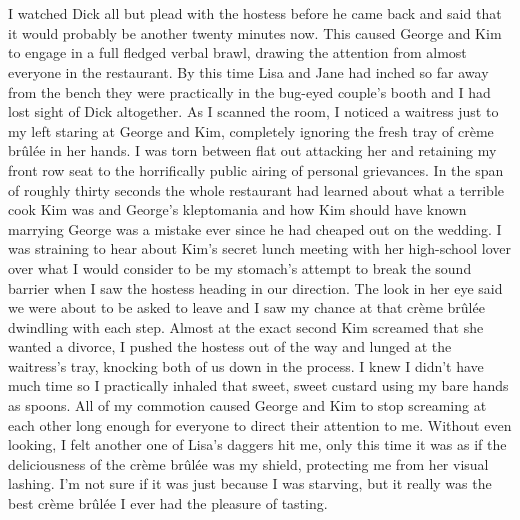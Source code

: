 \documentclass[]{book}
\begin{document}
\chapter{}\label{section-6}

I watched Dick all but plead with the hostess before he came back and
said that it would probably be another twenty minutes now. This caused
George and Kim to engage in a full fledged verbal brawl, drawing the
attention from almost everyone in the restaurant. By this time Lisa and
Jane had inched so far away from the bench they were practically in the
bug-eyed couple's booth and I had lost sight of Dick altogether. As I
scanned the room, I noticed a waitress just to my left staring at George
and Kim, completely ignoring the fresh tray of crème brûlée in her
hands. I was torn between flat out attacking her and retaining my front
row seat to the horrifically public airing of personal grievances. In
the span of roughly thirty seconds the whole restaurant had learned
about what a terrible cook Kim was and George's kleptomania and how Kim
should have known marrying George was a mistake ever since he had
cheaped out on the wedding. I was straining to hear about Kim's secret
lunch meeting with her high-school lover over what I would consider to
be my stomach's attempt to break the sound barrier when I saw the
hostess heading in our direction. The look in her eye said we were about
to be asked to leave and I saw my chance at that crème brûlée dwindling
with each step. Almost at the exact second Kim screamed that she wanted
a divorce, I pushed the hostess out of the way and lunged at the
waitress's tray, knocking both of us down in the process. I knew I
didn't have much time so I practically inhaled that sweet, sweet custard
using my bare hands as spoons. All of my commotion caused George and Kim
to stop screaming at each other long enough for everyone to direct their
attention to me. Without even looking, I felt another one of Lisa's
daggers hit me, only this time it was as if the deliciousness of the
crème brûlée was my shield, protecting me from her visual lashing. I'm
not sure if it was just because I was starving, but it really was the
best crème brûlée I ever had the pleasure of tasting.

\chapter{}\label{section-7}
\end{document}
